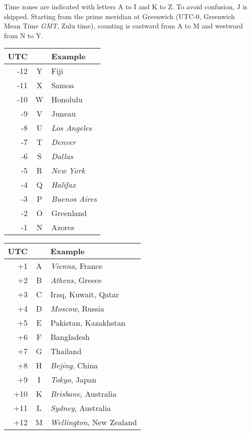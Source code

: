 \documentclass[a4paper,10pt]{scrarticle}
\begin{document}
\medskip\noindent{} Time zones are indicated with letters A to I and K to Z. To avoid confusion, J is skipped. Starting from the prime meridian at Greenwich (UTC-0, Greenwich Mean Time \emph{GMT}, Zulu time), counting is eastward from A to M and westward from N to Y.

\bigskip\begin{minipage}{0.4\textwidth}\label{tab:timezones}
\begin{tabular}{rcl}
\toprule
UTC & & Example \\
\midrule
-12 & Y & Fiji \\
-11 & X & Samoa \\
-10 & W & Honolulu \\
-9 & V & Juneau \\
-8 & U & \emph{Los Angeles} \\
-7 & T & \emph{Denver} \\
-6 & S & \emph{Dallas} \\
-5 & R & \emph{New York} \\
-4 & Q & \emph{Halifax} \\
-3 & P & \emph{Buenos Aires} \\
-2 & O & Greenland \\
-1 & N & Azores \\
\bottomrule
\end{tabular}
\end{minipage}
\begin{minipage}{0.4\textwidth}
\begin{tabular}{rcl}
\toprule
UTC & & Example \\
\midrule
+1 & A & \emph{Vienna}, France \\
+2 & B & \emph{Athens}, Greece\\
+3 & C & Iraq, Kuwait, Qatar\\
+4 & D & \emph{Moscow}, Russia\\
+5 & E & Pakistan, Kazakhstan\\
+6 & F & Bangladesh \\
+7 & G & Thailand \\
+8 & H & \emph{Bejing}, China \\
+9 & I & \emph{Tokyo}, Japan \\
+10 & K & \emph{Brisbane}, Australia \\
+11 & L & \emph{Sydney}, Australia \\
+12 & M & \emph{Wellington}, New Zealand \\
\bottomrule
\end{tabular}
\end{minipage}
\end{document}
